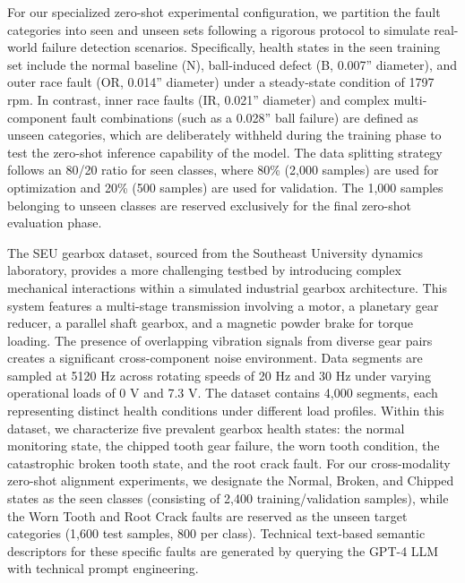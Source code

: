 \documentclass[journal]{IEEEtran}
\begin{document}
For our specialized zero-shot experimental configuration, we partition the fault categories into seen and unseen sets following a rigorous protocol to simulate real-world failure detection scenarios. Specifically, health states in the seen training set include the normal baseline (N), ball-induced defect (B, 0.007'' diameter), and outer race fault (OR, 0.014'' diameter) under a steady-state condition of 1797 rpm. In contrast, inner race faults (IR, 0.021'' diameter) and complex multi-component fault combinations (such as a 0.028'' ball failure) are defined as unseen categories, which are deliberately withheld during the training phase to test the zero-shot inference capability of the model. The data splitting strategy follows an 80/20 ratio for seen classes, where 80\% (2,000 samples) are used for optimization and 20\% (500 samples) are used for validation. The 1,000 samples belonging to unseen classes are reserved exclusively for the final zero-shot evaluation phase.

The SEU gearbox dataset, sourced from the Southeast University dynamics laboratory, provides a more challenging testbed by introducing complex mechanical interactions within a simulated industrial gearbox architecture. This system features a multi-stage transmission involving a motor, a planetary gear reducer, a parallel shaft gearbox, and a magnetic powder brake for torque loading. The presence of overlapping vibration signals from diverse gear pairs creates a significant cross-component noise environment. Data segments are sampled at 5120 Hz across rotating speeds of 20 Hz and 30 Hz under varying operational loads of 0 V and 7.3 V. The dataset contains 4,000 segments, each representing distinct health conditions under different load profiles. Within this dataset, we characterize five prevalent gearbox health states: the normal monitoring state, the chipped tooth gear failure, the worn tooth condition, the catastrophic broken tooth state, and the root crack fault. For our cross-modality zero-shot alignment experiments, we designate the Normal, Broken, and Chipped states as the seen classes (consisting of 2,400 training/validation samples), while the Worn Tooth and Root Crack faults are reserved as the unseen target categories (1,600 test samples, 800 per class). Technical text-based semantic descriptors for these specific faults are generated by querying the GPT-4 LLM with technical prompt engineering.
\end{document}
